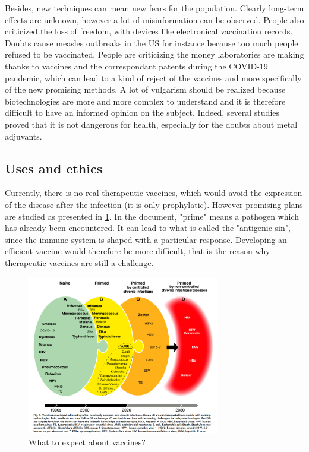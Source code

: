 \documentclass{article}
\begin{document}
            Besides, new techniques can mean new fears for the population.
            Clearly long-term effects are unknown, however a lot of misinformation can be observed.
            People also criticized the loss of freedom, with devices like electronical vaccination records.
            Doubts cause measles outbreaks in the US for instance because too much people refused to be vaccinated.
            People are criticizing the money laboratories are making thanks to vaccines and the correspondant patents during the COVID-19 pandemic, 
                which can lead to a kind of reject of the vaccines and more specifically of the new promising methods.
            A lot of vulgarism should be realized because biotechnologies are more and more complex to understand
                and it is therefore difficult to have an informed opinion on the subject. 
            Indeed, several studies proved that it is not dangerous for health, especially for the doubts about metal adjuvants.

    \subsection{Uses and ethics}
        
        Currently, there is no real therapeutic vaccines, which would avoid the expression of the disease after the infection (it is only prophylatic).
            However promising plans are studied as presented in \ref{fig:vaccEvolution}.
            In the document, "prime" means a pathogen which has already been encountered. It can lead to what is called the "antigenic sin", 
            since the immune system is shaped with a particular response. Developing an efficient vaccine would therefore be more difficult,
            that is the reason why therapeutic vaccines are still a challenge.

        \begin{figure}
            \centering
            \includegraphics[width=0.75\textwidth]{imgs/vaccineEvolution.PNG}
            \caption{What to expect about vaccines? \autocite{rappuoliVaccinologyPostCOVID192021}}
            \label{fig:vaccEvolution}
        \end{figure}
\end{document}
